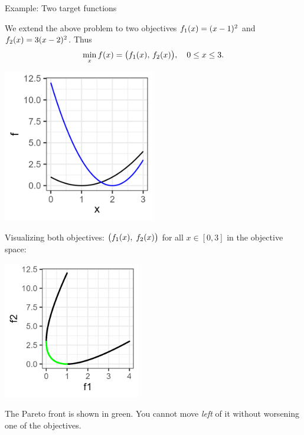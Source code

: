 \documentclass[11pt,compress,t,notes=noshow,xcolor=table]{beamer}
\begin{document}
\begin{vbframe}{Example: Two target functions}

We extend the above problem to two objectives 
\(f_1(x) = (x - 1)^2\) 
and 
\(f_2(x) = 3(x - 2)^2\). Thus
\[
  \min_{x} f(x) 
    = \bigl(f_1(x),\, f_2(x)\bigr),
  \quad 0 \le x \le 3.
\]

\begin{center}
\includegraphics[width=0.5\textwidth]{slides/11-multicrit/figure_man/graph2.png}
\end{center}

\framebreak

Visualizing both objectives:
$\bigl(f_1(x), \;f_2(x)\bigr)
$
for all \(x \in [0,3]\) in the objective space:

\begin{center}
\includegraphics[width=0.45\textwidth]{slides/11-multicrit/figure_man/graph3.png}
\end{center}

The Pareto front is shown in green. You cannot move \emph{left} of it without 
worsening one of the objectives.

\end{vbframe}
\end{document}
